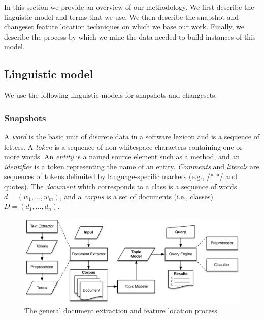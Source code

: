 
In this section we provide an overview of our methodology.
We first describe the linguistic model and terms that we use.
We then describe the snapshot and changeset feature location techniques on which we base our work.
Finally, we describe the process by which we mine the data needed to build instances of this model.

\subsection{Linguistic model}
\label{sec:extract}

We use the following linguistic models for snapshots and changesets.

\subsubsection{Snapshots}

A \textit{word} is the basic unit of discrete data in a software lexicon and is a sequence of letters.
A \textit{token} is a sequence of non-whitespace characters containing one or more words.
An \textit{entity} is a named source element such as a method,
and an \textit{identifier} is a token representing the name of an entity.
\textit{Comments} and \textit{literals} are sequences of tokens delimited by language-specific markers (e.g., /* */ and quotes).
The \textit{document} which corresponds to a class is a sequence of words $d = (w_1, \ldots, w_m)$,
and a \textit{corpus} is a set of documents (i.e., classes) $D = (d_1, \ldots, d_n)$.

\begin{figure}
\vspace{2mm}
\centerline{\includegraphics[width=.8625\textwidth]{figures/Process}}
\caption{The general document extraction and feature location process.}
\label{fig:process}
\vspace{-2mm}
\end{figure}

